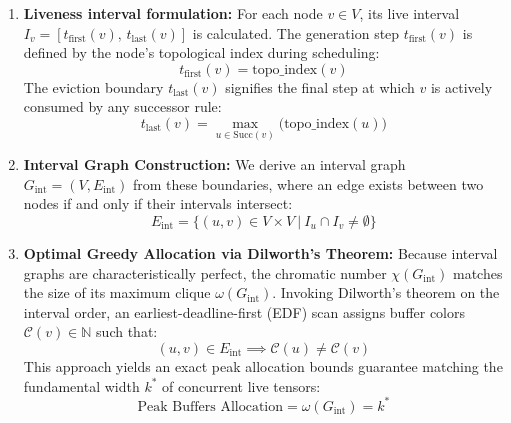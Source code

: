 \documentclass{article}
\begin{document}
\begin{enumerate}
    \item \textbf{Liveness interval formulation:} For each node $v \in V$, its live interval $I_v = [t_{\text{first}}(v),\, t_{\text{last}}(v)]$ is calculated. The generation step $t_{\text{first}}(v)$ is defined by the node's topological index during scheduling:
    \begin{equation}
        t_{\text{first}}(v) = \text{topo\_index}(v)
    \end{equation}
    The eviction boundary $t_{\text{last}}(v)$ signifies the final step at which $v$ is actively consumed by any successor rule:
    \begin{equation}
        t_{\text{last}}(v) = \max_{u \in \text{Succ}(v)} \Big( \text{topo\_index}(u) \Big)
    \end{equation}

    \item \textbf{Interval Graph Construction:} We derive an interval graph $G_{\text{int}} = (V, E_{\text{int}})$ from these boundaries, where an edge exists between two nodes if and only if their intervals intersect:
    \begin{equation}
        E_{\text{int}} = \Big\{ (u, v) \in V \times V \ \Big|\ I_u \cap I_v \neq \emptyset \Big\}
    \end{equation}

    \item \textbf{Optimal Greedy Allocation via Dilworth's Theorem:} Because interval graphs are characteristically perfect, the chromatic number $\chi(G_{\text{int}})$ matches the size of its maximum clique $\omega(G_{\text{int}})$. Invoking Dilworth's theorem on the interval order, an earliest-deadline-first (EDF) scan assigns buffer colors $\mathcal{C}(v) \in \mathbb{N}$ such that:
    \begin{equation}
        (u, v) \in E_{\text{int}} \implies \mathcal{C}(u) \neq \mathcal{C}(v)
    \end{equation}
    This approach yields an exact peak allocation bounds guarantee matching the fundamental width $k^*$ of concurrent live tensors:
    \begin{equation}
        \text{Peak Buffers Allocation} = \omega(G_{\text{int}}) = k^*
    \end{equation}
\end{enumerate}
\end{document}
